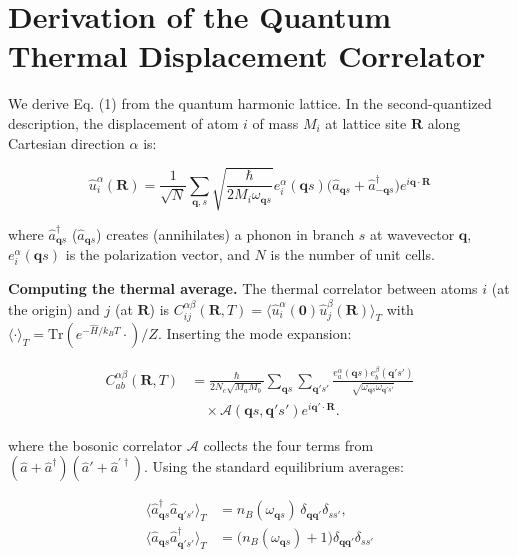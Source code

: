\documentclass[aps,prb,reprint,amsmath,amssymb,floatfix]{revtex4-2}
\begin{document}
\appendix

\section{Derivation of the Quantum Thermal Displacement
Correlator}\label{appendix-a-derivation-of-the-quantum-thermal-displacement-correlator}

We derive Eq. (1) from the quantum harmonic lattice. In the
second-quantized description, the displacement of atom \(i\) of mass
\(M_i\) at lattice site \(\mathbf{R}\) along Cartesian direction
\(\alpha\) is:

\begin{equation*}
\hat{u}_i^\alpha(\mathbf{R}) = \frac{1}{\sqrt{N}}\sum_{\mathbf{q},s}\sqrt{\frac{\hbar}{2M_i\omega_{\mathbf{q}s}}} e_i^\alpha(\mathbf{q}s)\bigl(\hat{a}_{\mathbf{q}s} + \hat{a}_{-\mathbf{q}s}^\dagger\bigr)e^{i\mathbf{q}\cdot\mathbf{R}}
\end{equation*}

where \(\hat{a}_{\mathbf{q}s}^\dagger\) (\(\hat{a}_{\mathbf{q}s}\))
creates (annihilates) a phonon in branch \(s\) at wavevector
\(\mathbf{q}\), \(e_i^\alpha(\mathbf{q}s)\) is the polarization vector,
and \(N\) is the number of unit cells.

\textbf{Computing the thermal average.} The thermal correlator between
atoms \(i\) (at the origin) and \(j\) (at \(\mathbf{R}\)) is
\(C_{ij}^{\alpha\beta}(\mathbf{R},T) = \langle\hat{u}_i^\alpha(\mathbf{0})\hat{u}_j^\beta(\mathbf{R})\rangle_T\)
with \(\langle\cdot\rangle_T = \mathrm{Tr}(e^{-\hat{H}/k_BT}\cdot)/Z\).
Inserting the mode expansion:

{\footnotesize
\begin{equation*}
\begin{aligned}
C_{ab}^{\alpha\beta}(\mathbf R,T)
 &=\frac{\hbar}{2N_c\sqrt{M_aM_b}}
   \sum_{\mathbf q s}\sum_{\mathbf q's'}
   \frac{e_a^\alpha(\mathbf q s)e_b^\beta(\mathbf q's')}
   {\sqrt{\omega_{\mathbf q s}\omega_{\mathbf q's'}}}\\
 &\quad\times\mathcal A(\mathbf q s,\mathbf q's')
 e^{i\mathbf q'\cdot\mathbf R}.
\end{aligned}
\end{equation*}
}

where the bosonic correlator \(\mathcal{A}\) collects the four terms
from \((\hat{a}+\hat{a}^\dagger)(\hat{a}'+\hat{a}^{\prime\dagger})\).
Using the standard equilibrium averages:

\begin{align*}
\langle\hat{a}_{\mathbf{q}s}^\dagger\hat{a}_{\mathbf{q}'s'}\rangle_T
  &= n_B(\omega_{\mathbf{q}s})\,\delta_{\mathbf{q}\mathbf{q}'}\delta_{ss'}, \\
\langle\hat{a}_{\mathbf{q}s}\hat{a}_{\mathbf{q}'s'}^\dagger\rangle_T
  &= \bigl(n_B(\omega_{\mathbf{q}s})+1\bigr)\delta_{\mathbf{q}\mathbf{q}'}\delta_{ss'}
\end{align*}
\end{document}
